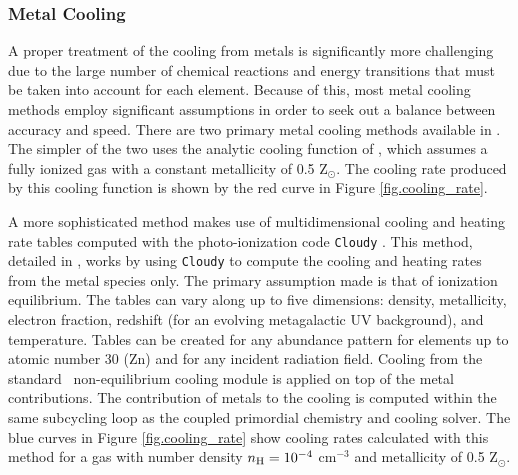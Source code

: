 \subsubsection{Metal Cooling}

A proper treatment of the cooling from metals is significantly more
challenging due to the large number of chemical reactions and energy
transitions that must be taken into account for each element.  Because
of this, most metal cooling methods employ significant assumptions in
order to seek out a balance between accuracy and speed.  There are two
primary metal cooling methods available in \enzo.  The simpler of the
two uses the analytic cooling function of \citet{SW87}, which assumes
a fully ionized gas with a constant metallicity of 0.5 Z$_{\odot}$.
The cooling rate produced by this cooling function is shown by the red 
curve in Figure \ref{fig.cooling_rate}.

A more sophisticated method makes use of multidimensional cooling and
heating rate tables computed with the photo-ionization code
\texttt{Cloudy} \citep{1998PASP..110..761F}.  This method, detailed in
\citet{2008MNRAS.385.1443S, 2011ApJ...731....6S}, works by
using \texttt{Cloudy} to compute the cooling and heating rates from
the metal species only.  The primary assumption made is that of
ionization equilibrium.  The tables can vary along up to five dimensions:
density, metallicity, electron fraction,
redshift (for an evolving metagalactic UV background), and
temperature.  Tables can be created for any abundance pattern for
elements up to atomic number 30 (Zn) and for any incident radiation
field.  Cooling from the standard \enzo\ non-equilibrium cooling module is
applied on top of the metal contributions.  The contribution of metals
to the cooling is computed within the same subcycling loop as the
coupled primordial chemistry and cooling solver.  The blue curves in
Figure \ref{fig.cooling_rate} show cooling rates calculated with this
method for a gas with number density $n_{\rm H} = 10^{-4}$ cm$^{-3}$ and
metallicity of 0.5 Z$_{\odot}$.

